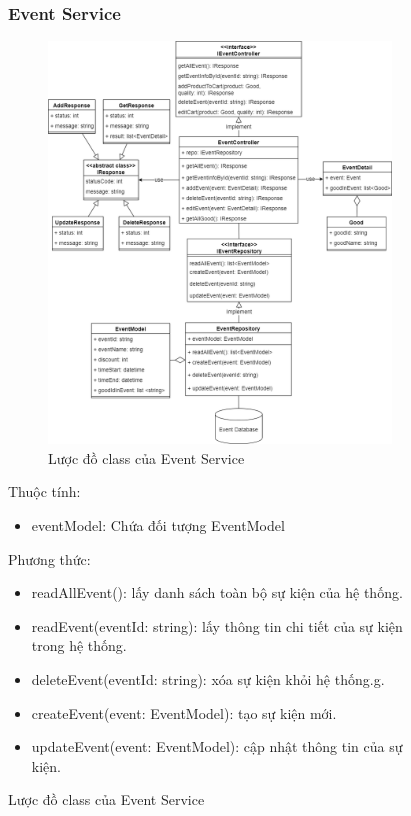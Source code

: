 \begin{figure}[!htp]
\subsubsection{Event Service}
\begin{figure}[!htp]
	\centering
	\includegraphics[width=11cm]{img/Architecture/service/EventService.png}
	\newline
	\caption{Lược đồ class của Event Service}
\end{figure}

Thuộc tính:
\begin{itemize}
	\item eventModel: Chứa đối tượng EventModel
\end{itemize}
Phương thức:
\begin{itemize}
	\item readAllEvent(): lấy danh sách toàn bộ sự kiện của hệ thống.
	\item readEvent(eventId: string): lấy thông tin chi tiết của sự kiện trong hệ thống.
	\item deleteEvent(eventId: string): xóa sự kiện khỏi hệ thống.g.
	\item createEvent(event: EventModel): tạo sự kiện mới.
	\item updateEvent(event: EventModel): cập nhật thông tin của sự kiện.
\end{itemize}


\end{figure}
